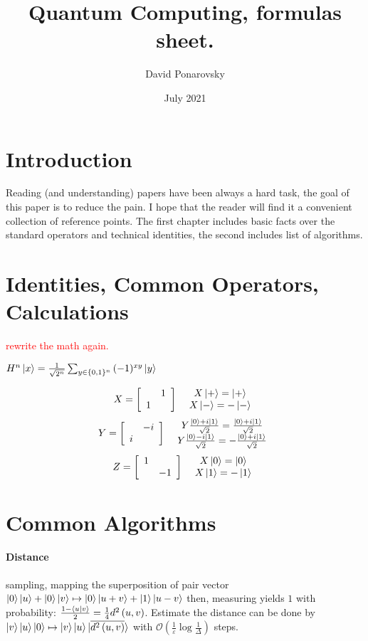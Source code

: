 \documentclass{article}
\title{Quantum Computing, formulas sheet.}
\author{David Ponarovsky}
\date{July 2021}
\begin{document}
\maketitle

\section{Introduction}
Reading (and understanding) papers have been always a hard task, the goal of this paper is to reduce the pain. I hope that the reader will find it a convenient collection of reference points.
The first chapter includes basic facts over the standard operators and technical identities, the second includes list of algorithms.


\section{Identities, Common Operators, Calculations }
\textcolor{red}{rewrite the math again. } 

\( H^{n} \ket{x}  = \frac{1}{\sqrt{2^n}} \sum_{y\in\{0,1\}^n}{(-1)^{xy}\ket{y}}\)

\[
X	=\left[\begin{array}{cc}
 & 1\\
1
\end{array}\right]\ \ \begin{array}{c}
X\ket{+}=\ket{+}\\
X\ket{-}=-\ket{-}
\end{array}
\]
\[
Y	=\left[\begin{array}{cc}
 & -i\\
i
\end{array}\right]\ \ \begin{array}{c}
Y\frac{\ket{0}+i\ket{1}}{\sqrt{2}}=\frac{\ket{0}+i\ket{1}}{\sqrt{2}}\\
Y\frac{\ket{0}-i\ket{1}}{\sqrt{2}}=-\frac{\ket{0}+i\ket{1}}{\sqrt{2}}
\end{array}
\]
\[
Z	=\left[\begin{array}{cc}
1\\
 & -1
\end{array}\right]\ \ \begin{array}{c}
X\ket{0}=\ket{0}\\
X\ket{1}=-\ket{1}
\end{array}
\]
\section{Common Algorithms}
\paragraph{Distance}
    sampling, mapping the superposition of pair vector  \( \ket{0}\ket{u}+\ket{0}\ket{v}	\mapsto\ket{0}\ket{u+v}+\ket{1}\ket{u-v} \) then, measuring yields \( 1 \) with probability:  
    	\( \frac{1-\braket{u|v}}{2}=\frac{1}{4}d^{2}\left(u,v\right) \).
    	Estimate the distance can be done by \( \ket{v}\ket{u}\ket{0}\mapsto\ket{v}\ket{u}\ket{\overline{d^{2}\left(u,v\right)}} \) with \( \mathcal{O}\left(\frac{1}{\varepsilon}\log\frac{1}{\Delta}\right) \) steps. 
	
\end{document}
